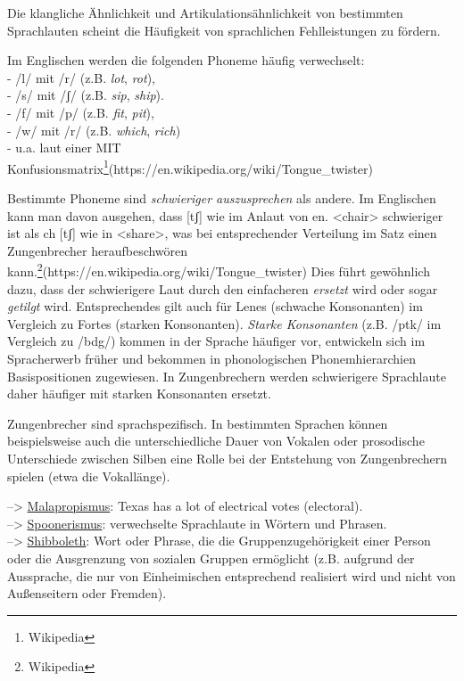 \documentclass[
  letterpaper,
]{scrbook}
\begin{document}
Die klangliche Ähnlichkeit und Artikulationsähnlichkeit von bestimmten
Sprachlauten scheint die Häufigkeit von sprachlichen Fehlleistungen zu
fördern.

Im Englischen werden die folgenden Phoneme häufig verwechselt:\\
- /l/ mit /r/ (z.B. \emph{lot}, \emph{rot}),\\
- /s/ mit /ʃ/ (z.B. \emph{sip}, \emph{ship}).\\
- /f/ mit /p/ (z.B. \emph{fit}, \emph{pit}),\\
- /w/ mit /r/ (z.B. \emph{which}, \emph{rich})\\
- u.a. laut einer MIT
Konfusionsmatrix\footnote{Wikipedia}(https://en.wikipedia.org/wiki/Tongue\_twister)

Bestimmte Phoneme sind \emph{schwieriger auszusprechen} als andere. Im
Englischen kann man davon ausgehen, dass {[}tʃ{]} wie im Anlaut von en.
\textless chair\textgreater{} schwieriger ist als ch {[}tʃ{]} wie in
\textless share\textgreater, was bei entsprechender Verteilung im Satz
einen Zungenbrecher heraufbeschwören
kann.\footnote{Wikipedia}(https://en.wikipedia.org/wiki/Tongue\_twister)
Dies führt gewöhnlich dazu, dass der schwierigere Laut durch den
einfacheren \emph{ersetzt} wird oder sogar \emph{getilgt} wird.
Entsprechendes gilt auch für Lenes (schwache Konsonanten) im Vergleich
zu Fortes (starken Konsonanten). \emph{Starke Konsonanten} (z.B. /ptk/
im Vergleich zu /bdg/) kommen in der Sprache häufiger vor, entwickeln
sich im Spracherwerb früher und bekommen in phonologischen
Phonemhierarchien Basispositionen zugewiesen. In Zungenbrechern werden
schwierigere Sprachlaute daher häufiger mit starken Konsonanten ersetzt.

Zungenbrecher sind sprachspezifisch. In bestimmten Sprachen können
beispielsweise auch die unterschiedliche Dauer von Vokalen oder
prosodische Unterschiede zwischen Silben eine Rolle bei der Entstehung
von Zungenbrechern spielen (etwa die Vokallänge).

--\textgreater{}
\href{https://en.wikipedia.org/wiki/Malapropism}{Malapropismus}: Texas
has a lot of electrical votes (electoral).\\
--\textgreater{}
\href{https://en.wikipedia.org/wiki/Spoonerism}{Spoonerismus}:
verwechselte Sprachlaute in Wörtern und Phrasen.\\
--\textgreater{}
\href{https://en.wikipedia.org/wiki/Shibboleth}{Shibboleth}: Wort oder
Phrase, die die Gruppenzugehörigkeit einer Person oder die Ausgrenzung
von sozialen Gruppen ermöglicht (z.B. aufgrund der Aussprache, die nur
von Einheimischen entsprechend realisiert wird und nicht von
Außenseitern oder Fremden).\\
\end{document}
